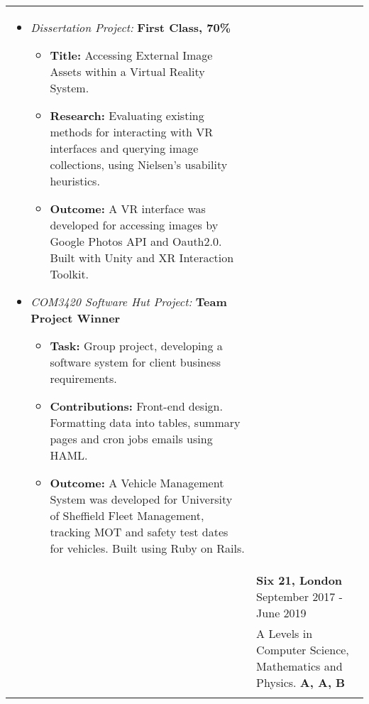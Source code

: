 \documentclass[11pt]{article}
\begin{document}
\begin{minipage}[t][0pt]{\linewidth}
\begin{tabular}[t]{p{2cm} p{14cm}}
	    \begin{itemize}
    		\renewcommand{\labelitemi}{$\diamond$}
        	    \item \textit{Dissertation Project:} \hfill \textbf{First Class, 70\%} 
        	    \begin{itemize}
    				\renewcommand{\labelitemii}{$\cdot$}
        			\item \textbf{Title:} Accessing External Image Assets within a Virtual Reality System.
					\item \textbf{Research:} Evaluating existing methods for interacting with VR interfaces and 
					querying image collections, using Nielsen's usability heuristics.
        			\item \textbf{Outcome:} A VR interface was developed for accessing images by Google Photos API and Oauth2.0.
					Built with Unity and XR Interaction Toolkit. 
			    \end{itemize}
	        	\item \textit{COM3420 Software Hut Project:} \hfill \textbf{Team Project Winner} 
        	    \begin{itemize}
    				\renewcommand{\labelitemii}{$\cdot$}
        			\item \textbf{Task:} Group project, developing a software system for client business requirements.
					\item \textbf{Contributions:} Front-end design. Formatting data into tables, summary pages and cron jobs emails using HAML. 
        			\item \textbf{Outcome:} A Vehicle Management System was developed for University of Sheffield Fleet Management, tracking MOT and safety test
					dates for vehicles. Built using Ruby on Rails.
					
		        \end{itemize}
		\end{itemize} \\ &
		
		\textbf{Six 21, London} \hfill September 2017 - June 2019 \\ &
		A Levels in Computer Science, Mathematics and Physics. \hfill \textbf{A, A, B} \\ &
		

\end{tabular}
\end{minipage}
\end{document}
